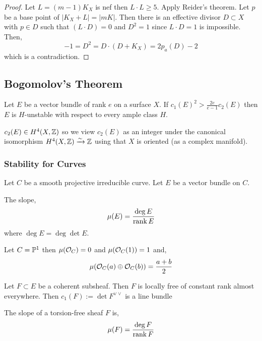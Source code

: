 \documentclass[12pt]{article}
\begin{document}
\begin{proof}
Let $L = (m-1) K_X$ is nef then $L \cdot L \ge 5$. Apply Reider's theorem. Let $p$ be a base point of $|K_X + L| = |m K|$. Then there is an effective divisor $D \subset X$ with $p \in D$ such that $(L \cdot D) = 0$ and $D^2 = 1$ since $L \cdot D = 1$ is impossible. Then,
\[ -1 = D^2 = D \cdot (D + K_X) = 2 p_a(D) - 2 \]
which is a contradiction. 
\end{proof}

\subsection{Bogomolov's Theorem}

\begin{theorem}[Bogomolov]
Let $E$ be a vector bundle of rank $e$ on a surface $X$. If $c_1(E)^2 > \frac{2 e}{e-1} c_2(E)$ then $E$ is $H$-unstable with respect to every ample class $H$.
\end{theorem}

\begin{rmk}
$c_2(E) \in H^4(X, \ZZ)$ so we view $c_2(E)$ as an integer under the canonical isomorphism $H^4(X, \ZZ) \iso \ZZ$ using that $X$ is oriented (as a complex manifold).
\end{rmk}

\subsubsection{Stability for Curves}

Let $C$ be a smooth projective irreducible curve. Let $E$ be a vector bundle on $C$. 

\begin{defn}
The slope,
\[ \mu(E) = \frac{\deg{E}}{\rank{E}} \]
where $\deg{E} = \deg{\det{E}}$.
\end{defn}

\begin{example}
Let $C = \P^1$ then $\mu(\struct{C}) = 0$ and $\mu(\struct{C}(1)) = 1$ and,
\[ \mu(\struct{C}(a) \oplus \struct{C}(b)) = \frac{a + b}{2} \]
\end{example}

\begin{defn}
Let $F \subset E$ be a coherent subsheaf. Then $F$ is locally free of constant rank almost everywhere. Then $c_1(F) := \det{F}^{\vee \vee}$ is a line bundle 
\end{defn}

\begin{defn}
The slope of a torsion-free sheaf $F$ is,
\[ \mu(F) = \frac{\deg{F}}{\rank{F}} \]
\end{defn}
\end{document}
